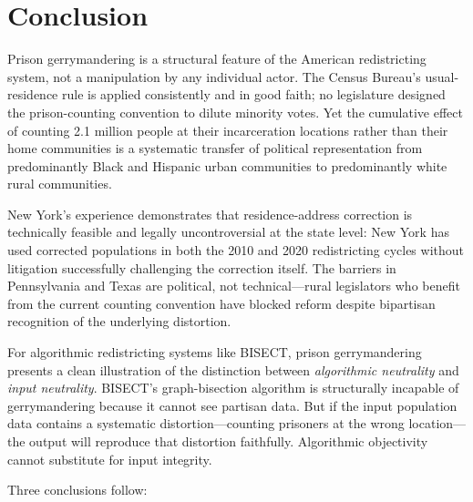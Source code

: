 \section{Conclusion}
\label{sec:conclusion}

Prison gerrymandering is a structural feature of the American redistricting system, not a manipulation by any individual actor. The Census Bureau's usual-residence rule is applied consistently and in good faith; no legislature designed the prison-counting convention to dilute minority votes. Yet the cumulative effect of counting 2.1 million people at their incarceration locations rather than their home communities is a systematic transfer of political representation from predominantly Black and Hispanic urban communities to predominantly white rural communities.

New York's experience demonstrates that residence-address correction is technically feasible and legally uncontroversial at the state level: New York has used corrected populations in both the 2010 and 2020 redistricting cycles without litigation successfully challenging the correction itself. The barriers in Pennsylvania and Texas are political, not technical---rural legislators who benefit from the current counting convention have blocked reform despite bipartisan recognition of the underlying distortion.

For algorithmic redistricting systems like BISECT, prison gerrymandering presents a clean illustration of the distinction between \emph{algorithmic neutrality} and \emph{input neutrality}. BISECT's graph-bisection algorithm is structurally incapable of gerrymandering because it cannot see partisan data. But if the input population data contains a systematic distortion---counting prisoners at the wrong location---the output will reproduce that distortion faithfully. Algorithmic objectivity cannot substitute for input integrity.

Three conclusions follow:

